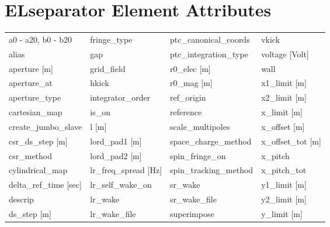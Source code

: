  \section{ELseparator Element Attributes}
 \label{s:list.elseparator}
 
 \begin{tabular}{llll} \toprule
a0 - a20, b0 - b20               & fringe_type                      & ptc_canonical_coords             & vkick                            \\
alias                            & gap                              & ptc_integration_type             & voltage [Volt]                   \\
aperture [m]                     & grid_field                       & r0_elec [m]                      & wall                             \\
aperture_at                      & hkick                            & r0_mag [m]                       & x1_limit [m]                     \\
aperture_type                    & integrator_order                 & ref_origin                       & x2_limit [m]                     \\
cartesian_map                    & is_on                            & reference                        & x_limit [m]                      \\
create_jumbo_slave               & l [m]                            & scale_multipoles                 & x_offset [m]                     \\
csr_ds_step [m]                  & lord_pad1 [m]                    & space_charge_method              & x_offset_tot [m]                 \\
csr_method                       & lord_pad2 [m]                    & spin_fringe_on                   & x_pitch                          \\
cylindrical_map                  & lr_freq_spread [Hz]              & spin_tracking_method             & x_pitch_tot                      \\
delta_ref_time [sec]             & lr_self_wake_on                  & sr_wake                          & y1_limit [m]                     \\
descrip                          & lr_wake                          & sr_wake_file                     & y2_limit [m]                     \\
ds_step [m]                      & lr_wake_file                     & superimpose                      & y_limit [m]                      \\

\end{tabular}
